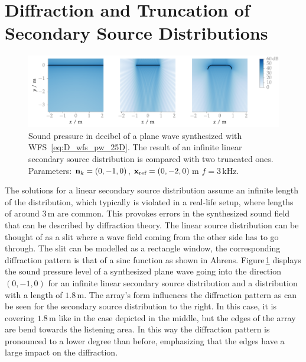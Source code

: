 \section[Diffraction and Truncation]{Diffraction and Truncation of Secondary Source Distributions}
\label{sec:diffraction_and_truncation_of_secondary_source_distributions}
%
\begin{figure}
    \includegraphics{fig3_03/fig3_03}
    \caption{Sound pressure in decibel of a plane wave synthesized with
    \twohalfD \ac{WFS}~\protect\eqref{eq:D_wfs_pw_25D}.
    The result of an infinite linear secondary source distribution is
    compared with two truncated ones. Parameters: $\mathbf{n}_k = (0,-1,0)$, $\mathbf{x}_\text{ref} =
    (0,-2,0)$\,m $f = 3$\,kHz.
    }
    \label{fig:sound_field_truncation}
\end{figure}
%
\noindent The solutions for a linear secondary source distribution assume an infinite
length of the distribution, which typically is violated in a real-life
setup, where lengths of around $3$\,m are common. This provok\-es errors in the
synthesized sound field that can be described by diffraction theory. The
linear source distribution can be thought of as a slit where a wave field
coming from the other side has to go through. The slit can be modelled as
a rectangle window, the corresponding diffraction pattern is that of a sinc
function as shown in Ahrens.\autocite[][(3.87)]{Ahrens2012}
Figure\,\ref{fig:sound_field_truncation} displays the sound pressure level
of a synthesized plane wave
going into the direction $(0,-1,0)$ for an infinite linear secondary source
distribution and a distribution with a length of $1.8$\,m. The array's form
influences the diffraction pattern as can be seen for the
secondary source distribution to the right. In this case, it is covering
$1.8$\,m like in the case depicted in the middle,
but the edges of the array are bend towards the listening area. In this way the diffraction
pattern is pronounced to a lower degree than before, emphasizing that the edges
have a large impact on the diffraction.

